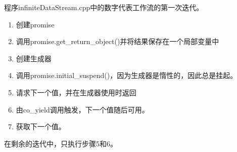 
程序infiniteDataStream.cpp中的数字代表工作流的第一次迭代。

\begin{enumerate}
\item 
创建promise

\item 
调用promise.get\_return\_object()并将结果保存在一个局部变量中
 
\item 
创建生成器

\item 
调用promise.initial\_suspend()，因为生成器是惰性的，因此总是挂起。

\item 
请求下一个值，并在生成器使用时返回

\item 
由co\_yield调用触发，下一个值随后可用。

\item 
获取下一个值。
\end{enumerate}

在剩余的迭代中，只执行步骤5和6。


